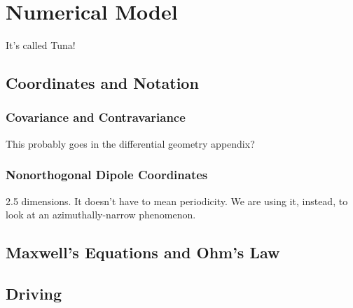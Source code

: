 
\chapter{Numerical Model}
\label{model_chapter}

It's called Tuna! 

\section{Coordinates and Notation}

\subsection{Covariance and Contravariance}

This probably goes in the differential geometry appendix?

\subsection{Nonorthogonal Dipole Coordinates}

2.5 dimensions. It doesn't have to mean periodicity. We are using it, instead, to look at an azimuthally-narrow phenomenon. 

\section{Maxwell's Equations and Ohm's Law}

\section{Driving}

